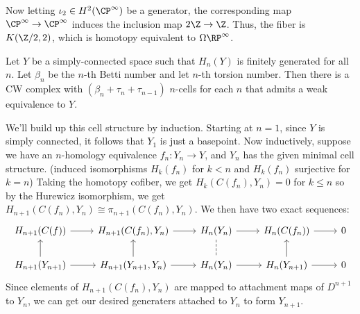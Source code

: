 \documentclass[11pt,letterpaper]{article}
\begin{document}
\begin{solution}
    \medskip
    \quad Now letting $\iota_2\in H^2(\CP^\infty)$ be a generator, the corresponding map $\CP^\infty\to \CP^\infty$ induces the inclusion map $2\Z \to \Z$. Thus, the fiber is $K(\Z / 2, 2)$, which is homotopy equivalent to $\Omega \RP^\infty$.
\end{solution}

\begin{problem}
    Let $Y$ be a simply-connected space such that $H_n(Y)$ is finitely generated for all $n$. Let $\beta_n$ be the $n$-th Betti number and let $n$-th torsion number. Then there is a CW complex with $(\beta_n+\tau_n+\tau_{n-1})$ $n$-cells for each $n$ that admits a weak equivalence to $Y$. %
\end{problem}

\quad We'll build up this cell structure by induction. Starting at $n=1$, since $Y$ is simply connected, it follows that $Y_1$ is just a basepoint. Now inductively, suppose we have an $n$-homology equivalence $f_n : Y_n \to Y$, and $Y_n$ has the given minimal cell structure. (induced isomorphisms $H_k(f_n)$ for $k<n$ and $H_k(f_n)$ surjective for $k=n$) Taking the homotopy cofiber, we get $H_k(C(f_n), Y_n) = 0$ for $k\leq n$ so by the Hurewicz isomorphism, we get $H_{n+1}(C(f_n), Y_n) \cong \pi_{n+1}(C(f_n), Y_n)$. We then have two exact sequences:
\[\begin{tikzcd}
	{H_{n+1}(C(f))} & {H_{n+1}(C(f_n), Y_n)} & {H_n(Y_n)} & {H_n(C(f_n))} & 0 \\
	{H_{n+1}(Y_{n+1})} & {H_{n+1}(Y_{n+1},Y_n)} & {H_n(Y_n)} & {H_n(Y_{n+1})} & 0
	\arrow[from=2-4, to=2-5]
	\arrow[from=1-4, to=1-5]
	\arrow[from=2-4, to=1-4]
	\arrow[from=2-2, to=1-2]
	\arrow[from=2-1, to=1-1]
	\arrow[from=2-1, to=2-2]
	\arrow[from=2-2, to=2-3]
	\arrow[from=2-3, to=2-4]
	\arrow[from=1-3, to=1-4]
	\arrow[from=1-2, to=1-3]
	\arrow[from=1-1, to=1-2]
	\arrow[dashed, no head, from=1-3, to=2-3]
\end{tikzcd}\]
Since elements of $H_{n+1}(C(f_n), Y_n)$ are mapped to attachment maps of $D^{n+1}$ to $Y_n$, we can get our desired generaters attached to $Y_n$ to form $Y_{n+1}$.
\end{document}
